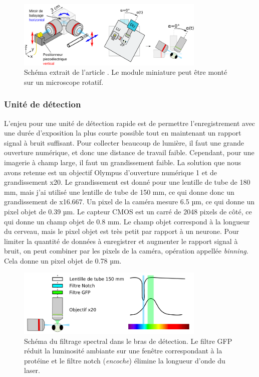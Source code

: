 \begin{figure}
\centering
\includegraphics[width=0.8\textwidth]{./files/miniature_light-sheet.svg.png}
\caption{Schéma extrait de l'article \cite{migault_whole-brain_2018}. Le module miniature peut être monté sur un microscope rotatif.
}
\end{figure}

\subsubsection{Unité de détection}

L'enjeu pour une unité de détection rapide est de permettre l'enregistrement avec une durée d'exposition la plus courte possible tout en maintenant un rapport signal à bruit suffisant. Pour collecter beaucoup de lumière, il faut une grande ouverture numérique, et donc une distance de travail faible. Cependant, pour une imagerie à champ large, il faut un grandissement faible. La solution que nous avons retenue est un objectif Olympus d'ouverture numérique 1 et de grandissement x20. Le grandissement est donné pour une lentille de tube de 180 mm, mais j'ai utilisé une lentille de tube de 150 mm, ce qui donne donc un grandissement de x16.667. Un pixel de la caméra mesure 6.5 µm, ce qui donne un pixel objet de 0.39 µm. Le capteur CMOS est un carré de 2048 pixels de côté, ce qui donne un champ objet de 0.8 mm. Le champ objet correspond à la longueur du cerveau, mais le pixel objet est très petit par rapport à un neurone. Pour limiter la quantité de données à enregistrer et augmenter le rapport signal à bruit, on peut combiner par les pixels de la caméra, opération appellée \emph{binning}. Cela donne un pixel objet de 0.78 µm.

\begin{figure}
\centering
\includegraphics[width=0.8\textwidth]{./files/detection_unit.svg.png}
\caption{Schéma du filtrage spectral dans le bras de détection. Le filtre GFP réduit la luminosité ambiante sur une fenêtre correspondant à la protéine et le filtre notch (\emph{encoche}) élimine la longueur d'onde du laser.}
\end{figure}


